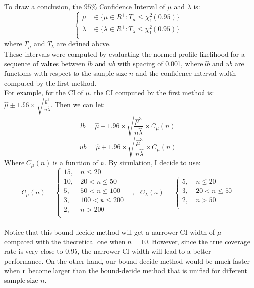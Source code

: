 \documentclass[12pt]{article}
\begin{document}
To draw a conclusion, the $95\%$ Confidence Interval of $\mu$ and $\lambda$ is: 
 \begin{equation*}
\left\{                         
\begin{aligned}
\mu &\in \{  \mu \in R^{+}:  T_{\mu}  \leq    \chi_{1}^2 (0.95) \}\\
\lambda &\in \{  \lambda \in R^{+}:  T_{\lambda}  \leq    \chi_{1}^2 (0.95) \}\\
\end{aligned}
\right.
\end{equation*}
where $T_{\mu}$ and $T_{\lambda}$ are defined above. \\

These intervals were computed by evaluating the normed profile likelihood for a sequence of values between $lb$ and $ub$ with spacing of 0.001, where $lb$ and $ub$ are functions with respect to the sample size $n$ and the confidence interval width computed by the first method.\\

For example, for the CI of $\mu$, the CI computed by the first method is: $\hat{\mu} \pm 1.96 \times \sqrt{\frac{\hat{\mu}^3}{n\hat{\lambda}}}$. Then we can let:
$$lb = \hat{\mu} -  1.96 \times \sqrt{\frac{\hat{\mu}^3}{n\hat{\lambda}}} \times C_{\mu}(n)$$
$$ub = \hat{\mu} +  1.96 \times \sqrt{\frac{\hat{\mu}^3}{n\hat{\lambda}}} \times C_{\mu}(n)$$
Where $C_{\mu}(n)$ is a function of $n$. By simulation, I decide to use:
 \begin{equation*}
 C_{\mu}(n)=
\left\{                         
\begin{aligned}
15 , \ & n \leq 20 \\
10 , \ & 20 < n \leq 50\\
5 , \ & 50 < n \leq 100\\
3 , \ & 100 < n \leq 200\\
2 , \ & n>200\\
\end{aligned}
\right. \ \ \ \ ;  \ \ \ 
 C_{\lambda}(n)=
\left\{                         
\begin{aligned}
5 , \ & n \leq 20 \\
3 , \ & 20 < n \leq 50\\
2 , \ & n>50\\
\end{aligned}
\right.
\end{equation*}
\\
Notice that this bound-decide method will get a narrower CI width of $\mu$ compared with the theoretical one when $n=10$. However, since the true coverage rate is very close to 0.95, the narrower CI width will lead to a better performance. On the other hand, our bound-decide method would be much faster when n become larger than the bound-decide method that is unified for different sample size $n$.\\
\end{document}
